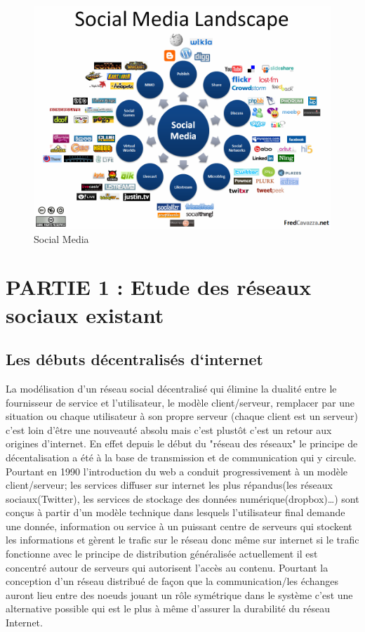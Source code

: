 \begin{figure}
                \centering
                \includegraphics[width=\textwidth]{Social-Media-Landscape.png}
                \caption{Social Media}
                \label{fig:Social Media}      
\end{figure}

\newpage
\section{PARTIE 1 : Etude des réseaux sociaux existant}

\subsection{Les débuts décentralisés d‘internet} 

La modélisation d'un réseau social décentralisé qui élimine la dualité entre le fournisseur de service et l'utilisateur, le modèle client/serveur, remplacer par une situation ou chaque utilisateur à son propre serveur (chaque client est un serveur) c'est loin d'être une nouveauté absolu mais c'est plustôt c'est un retour aux origines d'internet. 
En effet depuis le début du "réseau des réseaux" le principe de décentalisation a été à la base de transmission et de communication qui y circule.  Pourtant en 1990 l'introduction du web a conduit progressivement à un modèle client/serveur;  les services diffuser sur internet les plus répandus(les réseaux sociaux(Twitter), les services de stockage des données numérique(dropbox)…)
sont conçus à partir d'un modèle technique dans lesquels l'utilisateur final demande une donnée, information ou service à un puissant centre de serveurs qui stockent les informations et gèrent le trafic sur le réseau donc même sur internet si le trafic fonctionne avec le principe de distribution généralisée actuellement il est concentré autour de serveurs qui autorisent l'accès au contenu.
Pourtant la conception d'un réseau distribué de façon que la communication/les échanges auront lieu entre des noeuds jouant un rôle symétrique dans le système c'est une alternative possible qui est le plus à même d'assurer la durabilité du réseau Internet.

